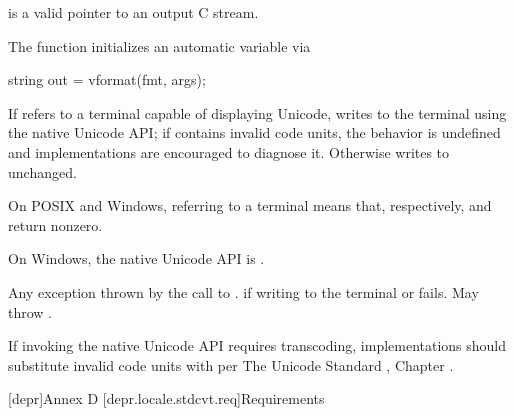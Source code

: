 \documentclass{wg21}
\begin{document}
\begin{itemdescr}
    \pnum
    \expects
     is a valid pointer to an output C stream.

    \pnum
    \effects
    The function initializes an automatic variable via
    \begin{codeblock}
        string out = vformat(fmt, args);
    \end{codeblock}
    If  refers to a terminal capable of displaying Unicode,
    writes  to the terminal using the native Unicode API;
    if  contains invalid code units,
    the behavior is undefined and
    implementations are encouraged to diagnose it.
    Otherwise writes  to  unchanged.
    \begin{note}
        On POSIX and Windows,  referring to a terminal means that,
        respectively,
         and
        return nonzero.
    \end{note}
    \begin{note}
        On Windows, the native Unicode API is .
    \end{note}

    \pnum
    \throws
    Any exception thrown by the call to .
     if writing to the terminal or  fails.
    May throw .

    \pnum
    \recommended
    If invoking the native Unicode API requires transcoding,
    implementations should substitute invalid code units
    with  per
    The Unicode Standard , Chapter .
\end{itemdescr}

[depr]{Annex D}
[depr.locale.stdcvt.req]{Requirements}
\end{document}
